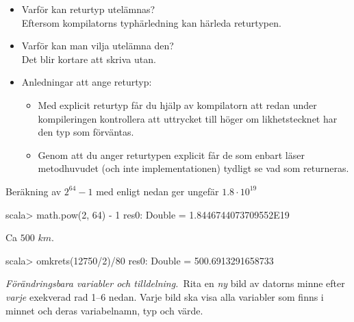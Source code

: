 \begin{itemize}
\item Varför kan returtyp utelämnas?\\Eftersom kompilatorns typhärledning kan härleda returtypen. 
\item Varför kan man vilja utelämna den?\\Det blir kortare att skriva utan. 
\item Anledningar att ange returtyp: 
\begin{itemize}
\item  Med explicit returtyp får du hjälp av kompilatorn att redan under kompileringen kontrollera att uttrycket till höger om likhetstecknet har den typ som förväntas. 

\item Genom att du anger returtypen explicit får de som enbart läser metodhuvudet (och inte implementationen)
 tydligt se vad som returneras.
\end{itemize}
\end{itemize}	


\SubtaskSolved Beräkning av $2^{64} - 1$ med  enligt nedan ger ungefär $1.8 \cdot 10^{19}$
\begin{REPL}
scala> math.pow(2, 64) - 1
res0: Double = 1.8446744073709552E19
\end{REPL}


\SubtaskSolved Ca $500$ $km$.
\begin{REPL}
scala> omkrets(12750/2)/80
res0: Double = 500.6913291658733
\end{REPL}

\QUESTEND








\def\what{\emph{Förändringsbara variabler och tilldelning.}}

\newcommand{\MEM}[3]{\vspace{0.5em}
\begin{tikzpicture}[font=\ttfamily]
\matrix [matrix of nodes, row sep=0, column 2/.style={nodes={rectangle,draw,minimum width=4em}}] (mat)
{
#1: #2 \pgfmatrixnextcell \makebox(16,12){#3}\\
};
\end{tikzpicture}
}


\QUESTBEGIN

\Task \what~Rita en \emph{ny} bild av datorns minne efter \emph{varje} exekverad rad 1--6 nedan. Varje bild ska visa alla variabler som finns i minnet och deras variabelnamn, typ och värde.

